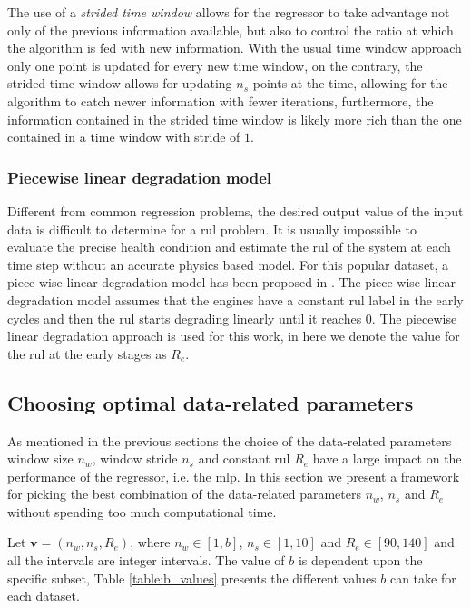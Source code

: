 The use of a \textit{strided time window} allows for the regressor to take advantage not only of the previous information available, but also to control the ratio at which the algorithm is fed with new information. With the usual time window approach only one point is updated for every new time window, on the contrary, the strided time window allows for updating $n_s$ points at the time, allowing for the algorithm to catch newer information with fewer iterations, furthermore, the information contained in the strided time window is likely more rich than the one contained in a time window with stride of $1$.

\subsubsection{Piecewise linear degradation model}

Different from common regression problems, the desired output value of the input data is difficult to determine for a \gls{rul} problem. It is usually impossible to evaluate the precise health condition and estimate the \gls{rul} of the system at each time step without an accurate physics based model. For this popular dataset, a piece-wise linear degradation model has been proposed in \cite{Ramasso2014}. The piece-wise linear degradation model assumes that the engines have a constant \gls{rul} label in the early cycles and then the \gls{rul} starts degrading linearly until it reaches 0. The piecewise linear degradation approach is used for this work, in here we denote the value for the \gls{rul} at the early stages as $R_e$. 

\subsection{Choosing optimal data-related parameters}

As mentioned in the previous sections the choice of the data-related parameters window size $n_w$, window stride $n_s$ and constant \gls{rul} $R_e$ have a large impact on the performance of the regressor, i.e. the \gls{mlp}. In this section we present a framework for picking the best combination of the data-related parameters $n_w$, $n_s$ and $R_e$ without spending too much computational time.

Let $\mathbf{v} = (n_w, n_s, R_e)$, where $n_w \in \left[1, b\right]$, $n_s \in \left[1, 10\right]$ and $R_e \in \left[90, 140 \right]$ and all the intervals are integer intervals. The value of $b$ is dependent upon the specific subset, Table \ref{table:b_values} presents the different values $b$ can take for each dataset.

